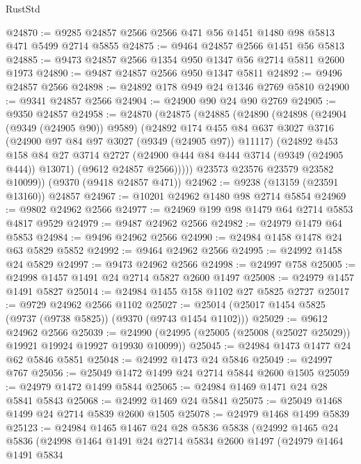 \begin{lexlean}{RustStd}
\begin{coremodule}
@24870 := @9285 @24857 @2566 @2566 @471 @56 @1451 @1480 @98 @5813 @471 @5499 @2714 @5855
@24875 := @9464 @24857 @2566 @1451 @56 @5813
@24885 := @9473 @24857 @2566 @1354 @950 @1347 @56 @2714 @5811 @2600 @1973
@24890 := @9487 @24857 @2566 @950 @1347 @5811
@24892 := @9496 @24857 @2566
@24898 := @24892 @178 @949 @24 @1346 @2769 @5810
@24900 := @9341 @24857 @2566
@24904 := @24900 @90 @24 @90 @2769
@24905 := @9350 @24857
@24958 := @24870
    (@24875
      (@24885
        (@24890
          (@24898
            (@24904 (@9349 (@24905 @90)) @9589)
            (@24892
              @174
              @455
              @84
              @637
              @3027
              @3716
              (@24900 @97 @84 @97 @3027 (@9349 (@24905 @97)) @11117)
              (@24892
                @453
                @158
                @84
                @27
                @3714
                @2727
                (@24900 @444 @84 @444 @3714 (@9349 (@24905 @444)) @13071)
                (@9612 @24857 @2566)))))
        @23573
        @23576
        @23579
        @23582
        @10099))
    (@9370 (@9418 @24857 @471))
@24962 := @9238 (@13159 (@23591 @13160)) @24857
@24967 := @10201 @24962 @1480 @98 @2714 @5854
@24969 := @9802 @24962 @2566
@24977 := @24969 @199 @98 @1479 @64 @2714 @5853 @4817 @9529
@24979 := @9487 @24962 @2566
@24982 := @24979 @1479 @64 @5853
@24984 := @9496 @24962 @2566
@24990 := @24984 @1458 @1478 @24 @63 @5829 @5852
@24992 := @9464 @24962 @2566
@24995 := @24992 @1458 @24 @5829
@24997 := @9473 @24962 @2566
@24998 := @24997 @758
@25005 := @24998 @1457 @1491 @24 @2714 @5827 @2600 @1497
@25008 := @24979 @1457 @1491 @5827
@25014 := @24984 @1455 @158 @1102 @27 @5825 @2727
@25017 := @9729 @24962 @2566 @1102
@25027 := @25014 (@25017 @1454 @5825 (@9737 (@9738 @5825)) (@9370 (@9743 @1454 @1102)))
@25029 := @9612 @24962 @2566
@25039 := @24990 (@24995 (@25005 (@25008 (@25027 @25029)) @19921 @19924 @19927 @19930 @10099))
@25045 := @24984 @1473 @1477 @24 @62 @5846 @5851
@25048 := @24992 @1473 @24 @5846
@25049 := @24997 @767
@25056 := @25049 @1472 @1499 @24 @2714 @5844 @2600 @1505
@25059 := @24979 @1472 @1499 @5844
@25065 := @24984 @1469 @1471 @24 @28 @5841 @5843
@25068 := @24992 @1469 @24 @5841
@25075 := @25049 @1468 @1499 @24 @2714 @5839 @2600 @1505
@25078 := @24979 @1468 @1499 @5839
@25123 := @24984
    @1465
    @1467
    @24
    @28
    @5836
    @5838
    (@24992
      @1465
      @24
      @5836
      (@24998
        @1464
        @1491
        @24
        @2714
        @5834
        @2600
        @1497
        (@24979
          @1464
          @1491
          @5834

\end{coremodule}
\end{lexlean}
